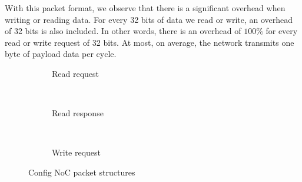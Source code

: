 With this packet format, we observe that there is a significant overhead when writing or reading data.
For every 32 bits of data we read or write, an overhead of 32 bits is also included.
In other words, there is an overhead of $100\%$ for every read or write request of 32 bits.
At most, on average, the network transmits one byte of payload data per cycle.


\hspace*{0.5em}
\begin{figure}[htbp]
    \centering
    \begin{subfigure}[b]{\linewidth}
        \centering
        \begin{adjustbox}{width=0.8\linewidth}
            
        \end{adjustbox}
        \caption{Read request}
        \label{fig:read_request_packet}
    \end{subfigure}
    \\ \vspace{1.5em}
    \begin{subfigure}[b]{\linewidth}
        \centering
        \begin{adjustbox}{width=0.8\linewidth}
            
        \end{adjustbox}
        \caption{Read response}
        \label{fig:read_response_packet}
    \end{subfigure}
    \\ \vspace{1.5em}
    \begin{subfigure}[b]{\linewidth}
        \centering
        \begin{adjustbox}{width=0.8\linewidth}
            
        \end{adjustbox}
        \caption{Write request}
        \label{fig:write_request_packet}
    \end{subfigure}
    \caption{
        Config NoC packet structures
    }
    \label{fig:config_noc_packets}
\end{figure}
